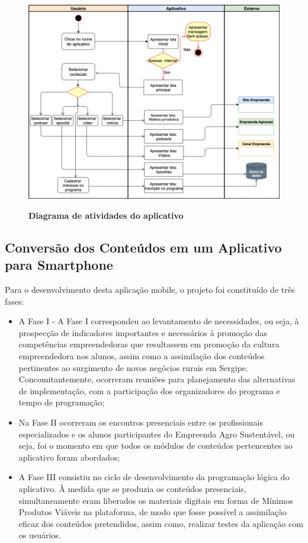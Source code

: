 \begin{figure}[H]
\centering
\caption{\textbf{Diagrama de atividades do aplicativo}}
\includegraphics[scale=0.4]{Imagens/diagrama_aplicativo.png}
\label{figura_diagrama}
\end{figure}


\subsection{Conversão dos Conteúdos em um Aplicativo para Smartphone}

Para o desenvolvimento desta aplicação mobile, o projeto foi constituído de três fases: 

\begin{itemize}

\item{A Fase I - A Fase I correspondeu ao levantamento de necessidades, ou seja, à prospecção de indicadores importantes e necessários à promoção das competências empreendedoras que resultassem em promoção da cultura empreendedora nos alunos, assim como a assimilação dos conteúdos pertinentes ao surgimento de novos negócios rurais em Sergipe. Concomitantemente, ocorreram reuniões para planejamento das alternativas de implementação, com a participação dos organizadores do programa e tempo de programação;}

\item{Na Fase II ocorreram os encontros presenciais entre os profissionais especializados e os alunos participantes do Empreenda Agro Sustentável, ou seja, foi o momento em que todos os módulos de conteúdos pertencentes ao aplicativo foram abordados;}

\item{A Fase III consistiu no ciclo de desenvolvimento da programação lógica do aplicativo. À medida que se produzia os conteúdos presenciais, simultaneamente eram liberados os materiais digitais em forma de Mínimos Produtos Viáveis na plataforma, de modo que fosse possível a assimilação eficaz dos conteúdos pretendidos, assim como, realizar testes da aplicação com os usuários.}

\end{itemize}

